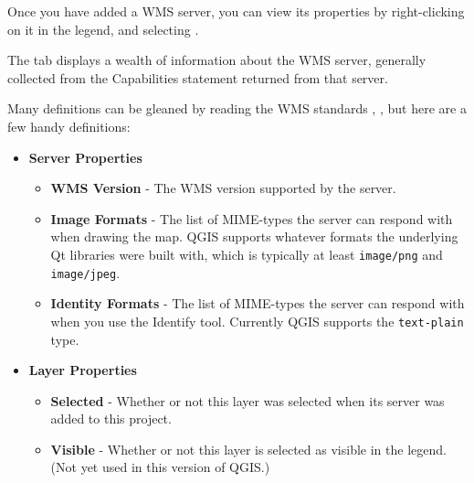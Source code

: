 Once you have added a WMS server, you can view its properties
by right-clicking on it in the legend, and selecting
.


\label{sec:ogc-wms-properties-metadata}

The  tab displays a wealth of information about the WMS server,
generally collected from the Capabilities statement returned from
that server.

Many definitions can be gleaned by reading the WMS
standards \cite{OGCWMS010101web}, \cite{OGCWMS010300web}, but
here are a few handy definitions:

\begin{itemize}[label=--]
\item \textbf{Server Properties}

\begin{itemize}[label=--]
\item \textbf{WMS Version}      - The WMS version supported by the server.

\item \textbf{Image Formats}    - The list of MIME-types the server can respond with when
                                  drawing the map.  QGIS supports whatever formats
                                  the underlying Qt libraries were built with, which
                                  is typically at least \texttt{image/png}
                                  and \texttt{image/jpeg}.

\item \textbf{Identity Formats} - The list of MIME-types the server can respond with when
                                  you use the Identify tool.  Currently QGIS supports
                                  the \texttt{text-plain} type.

\end{itemize}

\item \textbf{Layer Properties}

\begin{itemize}[label=--]
\item \textbf{Selected}         - Whether or not this layer was selected when its                                                                        server was added to this project.

\item \textbf{Visible}          - Whether or not this layer is selected as visible
                                  in the legend.  (Not yet used in this version of QGIS.)


\end{itemize}
\end{itemize}
